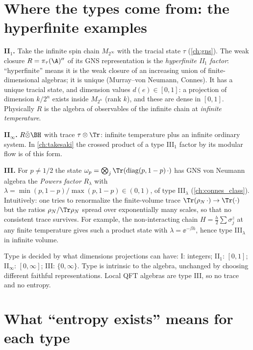 \section{Where the types come from: the hyperfinite examples}

\textbf{II$_1$.} Take the infinite spin chain $M_{2^\infty}$ with the tracial state $\tau$ (\cref{ch:gns}). The weak closure $R=\pi_\tau(\A)''$ of its GNS representation is the \emph{hyperfinite II$_1$ factor}: ``hyperfinite'' means it is the weak closure of an increasing union of finite-dimensional algebras; it is unique (Murray--von Neumann, Connes). It has a unique tracial state, and dimension values $d(e)\in[0,1]$: a projection of dimension $k/2^n$ exists inside $M_{2^n}$ (rank $k$), and these are dense in $[0,1]$. Physically $R$ is the algebra of observables of the infinite chain at \emph{infinite temperature}.

\textbf{II$_\infty$.} $R\bar\otimes\BH$ with trace $\tau\otimes\Tr$: infinite temperature plus an infinite ordinary system. In \cref{ch:takesaki} the crossed product of a type III$_1$ factor by its modular flow is of this form.

\textbf{III.} For $p\ne1/2$ the state $\omega_p=\bigotimes_j\Tr(\mathrm{diag}(p,1-p)\,\cdot)$ has GNS von Neumann algebra the \emph{Powers factor} $R_\lambda$ with $\lambda=\min(p,1-p)/\max(p,1-p)\in(0,1)$, of type III$_\lambda$ (\cref{ch:connes_class}). Intuitively: one tries to renormalize the finite-volume trace $\Tr(\rho_N\,\cdot)\to\Tr(\cdot)$ but the ratios $\rho_N/\Tr\rho_N$ spread over exponentially many scales, so that no consistent trace survives. For example, the non-interacting chain $H=\frac h2\sum\sigma^z_j$ at any finite temperature gives such a product state with $\lambda=\ee^{-\beta h}$, hence type III$_\lambda$ in infinite volume.

\begin{keyidea}
Type is decided by what dimensions projections can have: I: integers; II$_1$: $[0,1]$; II$_\infty$: $[0,\infty]$; III: $\{0,\infty\}$. Type is intrinsic to the algebra, unchanged by choosing different faithful representations. Local QFT algebras are type III, so no trace and no entropy.
\end{keyidea}

\section{What ``entropy exists'' means for each type}

